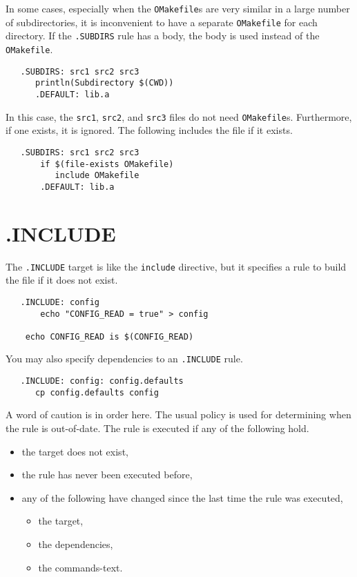In some cases, especially when the \verb+OMakefile+s are very similar in a large number of
subdirectories, it is inconvenient to have a separate \verb+OMakefile+ for each directory.  If the
\verb+.SUBDIRS+ rule has a body, the body is used instead of the \verb+OMakefile+.

\begin{verbatim}
   .SUBDIRS: src1 src2 src3
      println(Subdirectory $(CWD))
      .DEFAULT: lib.a
\end{verbatim}

In this case, the \verb+src1+, \verb+src2+, and \verb+src3+ files do not need \verb+OMakefile+s.
Furthermore, if one exists, it is ignored.  The following includes the file if it exists.

\begin{verbatim}
   .SUBDIRS: src1 src2 src3
       if $(file-exists OMakefile)
          include OMakefile
       .DEFAULT: lib.a
\end{verbatim}

\section{.INCLUDE}

The \verb+.INCLUDE+ target is like the \verb+include+ directive, but it specifies a rule to build
the file if it does not exist.

\begin{verbatim}
   .INCLUDE: config
       echo "CONFIG_READ = true" > config

    echo CONFIG_READ is $(CONFIG_READ)
\end{verbatim}

You may also specify dependencies to an \verb+.INCLUDE+ rule.

\begin{verbatim}
   .INCLUDE: config: config.defaults
      cp config.defaults config
\end{verbatim}

A word of caution is in order here.  The usual policy is used for determining when the rule is
out-of-date.  The rule is executed if any of the following hold.

\begin{itemize}
\item the target does not exist,
\item the rule has never been executed before,
\item any of the following have changed since the last time the rule was executed,
\begin{itemize}
\item the target,
\item the dependencies,
\item the commands-text.
\end{itemize}
\end{itemize}

